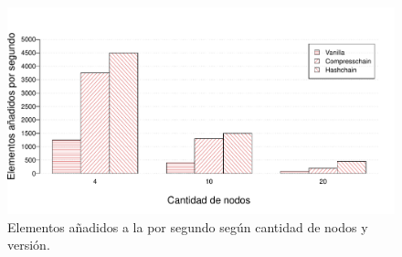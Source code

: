 \begin{figure}
	\centering
	\includegraphics[scale=0.6]{figures/comparativos.pdf}
	\caption{Elementos añadidos a la \setchain por segundo según cantidad de nodos y versión.}
	\label{fig:resultados_comparados}
\end{figure}




